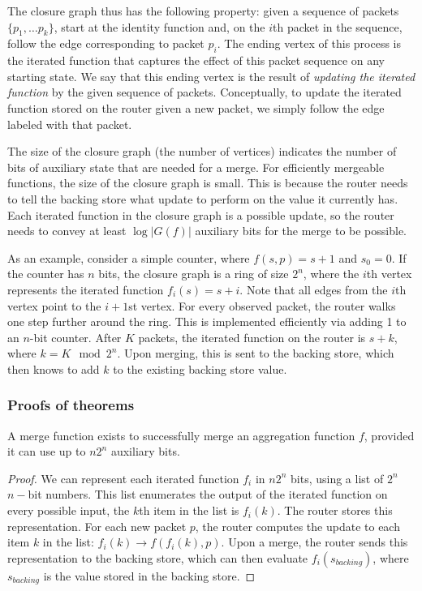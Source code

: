 The closure graph thus has the following property: given a sequence of packets
$\{p_1, \ldots p_k\}$, start at the identity function and, on the $i$th packet
in the sequence, follow the edge corresponding to packet $p_i$. The ending
vertex of this process is the iterated function that captures the effect of
this packet sequence on any starting state. We say that this ending vertex is
the result of \emph{updating the iterated function} by the given sequence of
packets. Conceptually, to update the iterated function stored on the router
given a new packet, we simply follow the edge labeled with that packet.

The size of the closure graph (\ie the number of vertices) indicates the number
of bits of auxiliary state that are needed for a merge. For efficiently
mergeable functions, the size of the closure graph is small. This is because
the router needs to tell the backing store what update to perform on the value
it currently has. Each iterated function in the closure graph is a possible
update, so the router needs to convey at least $\log |G(f)|$ auxiliary bits for
the merge to be possible.

As an example, consider a simple counter, where $f(s, p) = s + 1$ and $s_0 =
0$. If the counter has $n$ bits, the closure graph is a ring of size $2^n$,
where the $i$th vertex represents the iterated function $f_i(s) = s + i$. Note
that all edges from the $i$th vertex point to the $i+1$st vertex. For every
observed packet, the router walks one step further around the ring. This is
implemented efficiently via adding 1 to an $n$-bit counter. After $K$ packets,
the iterated function on the router is $s + k$, where $k = K \mod 2^n$. Upon
merging, this is sent to the backing store, which then knows to add $k$ to the
existing backing store value.

\subsubsection{Proofs of theorems}
\label{ss:proofs}

\begin{theorem}
A merge function exists to successfully merge an aggregation function $f$,
provided it can use up to $n2^n$ auxiliary bits.
\end{theorem}
\begin{proof}
We can represent each iterated function $f_i$ in $n2^n$ bits, using a list of
$2^n$ $n-$bit numbers. This list enumerates the output of the iterated function
on every possible input, \ie the $k$th item in the list is $f_i(k)$. The router
stores this representation. For each new packet $p$, the router computes the
update to each item $k$ in the list: $f_i(k) \rightarrow f(f_i(k), p)$. Upon a
merge, the router sends this representation to the backing store, which can
then evaluate $f_i(s_{backing})$, where $s_{backing}$ is the value stored in
the backing store.
\end{proof}

